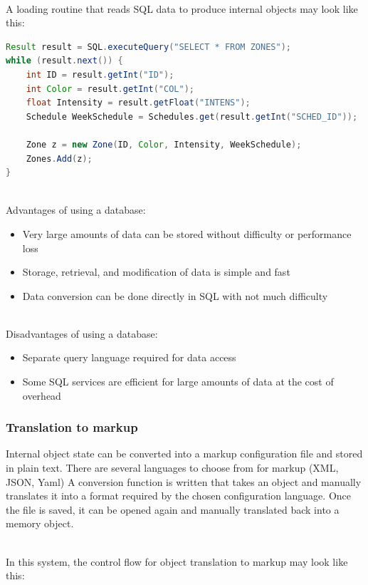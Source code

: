 		\noindent \\A loading routine that reads SQL data to produce internal objects may look like this:

	\begin{lstlisting}[language=JAVA]
Result result = SQL.executeQuery("SELECT * FROM ZONES");
while (result.next()) {
	int ID = result.getInt("ID");
	int Color = result.getInt("COL");
	float Intensity = result.getFloat("INTENS");
	Schedule WeekSchedule = Schedules.get(result.getInt("SCHED_ID"));

	Zone z = new Zone(ID, Color, Intensity, WeekSchedule);
	Zones.Add(z);
}
\end{lstlisting}

\noindent \\Advantages of using a database:
\begin{itemize}
	\item Very large amounts of data can be stored without difficulty or performance loss
	\item Storage, retrieval, and modification of data is simple and fast
	\item Data conversion can be done directly in SQL with not much difficulty
\end{itemize}

\noindent \\Disadvantages of using a database:
\begin{itemize}
	\item Separate query language required for data access
	\item Some SQL services are efficient for large amounts of data at the cost of overhead
\end{itemize}


		\subsubsection{Translation to markup}
		Internal object state can be converted into a markup configuration file and stored in plain text.
		There are several languages to choose from for markup (XML, JSON, Yaml) \cite{config1}
		A conversion function is written that takes an object and manually translates it into a format required by the chosen configuration language.
		Once the file is saved, it can be opened again and manually translated back into a memory object.

		\noindent \\In this system, the control flow for object translation to markup may look like this:

